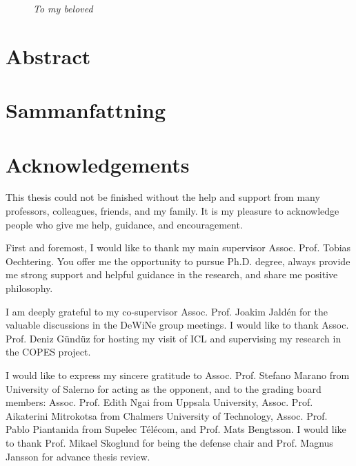 \documentclass[g5paper,phd,electronic]{kthesis}
\numberwithin{theorem}{chapter}
\numberwithin{lemma}{chapter}
\numberwithin{proposition}{chapter}
\numberwithin{corollary}{chapter}
\numberwithin{remark}{chapter}
\numberwithin{property}{chapter}
\numberwithin{conjecture}{chapter}
\numberwithin{assumption}{chapter}
\numberwithin{algorithm}{chapter}
\begin{document}
\frontmatter
\maketitle
\thispagestyle{empty}
\vfill
\begin{figure}
\begin{flushright}
\Large
\textit{To my beloved}
\end{flushright}
\end{figure}
\vfill
\chapter{Abstract}

\clearpage

\chapter{Sammanfattning}

\clearpage

\chapter{Acknowledgements}
This thesis could not be finished without the help and support from many professors, colleagues, friends, and my family. It is my pleasure to acknowledge people who give me help, guidance, and encouragement.

First and foremost, I would like to thank my main supervisor Assoc. Prof. Tobias Oechtering. You offer me the opportunity to pursue Ph.D. degree, always provide me strong support and helpful guidance in the research, and share me positive philosophy.

I am deeply grateful to my co-supervisor Assoc. Prof. Joakim Jald\'{e}n for the valuable discussions in the DeWiNe group meetings. I would like to thank Assoc. Prof. Deniz G\"{u}nd\"{u}z for hosting my visit of ICL and supervising my research in the COPES project.

I would like to express my sincere gratitude to Assoc. Prof. Stefano Marano from University of Salerno for acting as the opponent, and to the grading board members: Assoc. Prof. Edith Ngai from Uppsala University, Assoc. Prof. Aikaterini Mitrokotsa from Chalmers University of Technology, Assoc. Prof. Pablo Piantanida from Supelec T\'{e}l\'{e}com, and Prof. Mats Bengtsson. I would like to thank Prof. Mikael Skoglund for being the defense chair and Prof. Magnus Jansson for advance thesis review.
\end{document}
